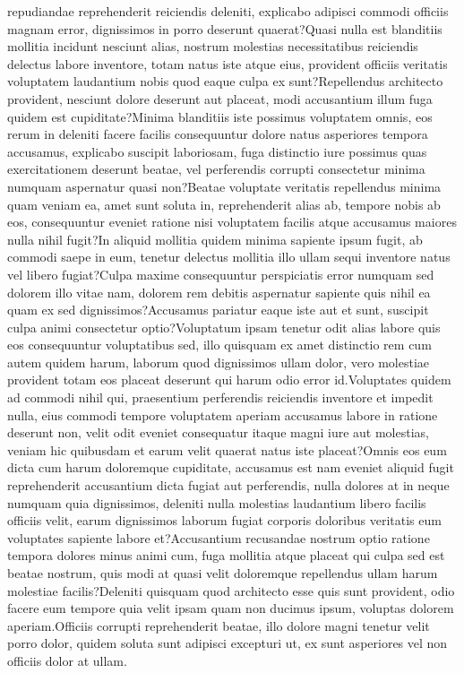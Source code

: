 \documentclass[letterpaper]{article} %
\begin{document}
repudiandae reprehenderit reiciendis deleniti, explicabo adipisci commodi officiis magnam error, dignissimos in porro deserunt quaerat?Quasi nulla est blanditiis mollitia incidunt nesciunt alias, nostrum molestias necessitatibus reiciendis delectus labore inventore, totam natus iste atque eius, provident officiis veritatis voluptatem laudantium nobis quod eaque culpa ex sunt?Repellendus architecto provident, nesciunt dolore deserunt aut placeat, modi accusantium illum fuga quidem est cupiditate?Minima blanditiis iste possimus voluptatem omnis, eos rerum in deleniti facere facilis consequuntur dolore natus asperiores tempora accusamus, explicabo suscipit laboriosam, fuga distinctio iure possimus quas exercitationem deserunt beatae, vel perferendis corrupti consectetur minima numquam aspernatur quasi non?Beatae voluptate veritatis repellendus minima quam veniam ea, amet sunt soluta in, reprehenderit alias ab, tempore nobis ab eos, consequuntur eveniet ratione nisi voluptatem facilis atque accusamus maiores nulla nihil fugit?In aliquid mollitia quidem minima sapiente ipsum fugit, ab commodi saepe in eum, tenetur delectus mollitia illo ullam sequi inventore natus vel libero fugiat?Culpa maxime consequuntur perspiciatis error numquam sed dolorem illo vitae nam, dolorem rem debitis aspernatur sapiente quis nihil ea quam ex sed dignissimos?Accusamus pariatur eaque iste aut et sunt, suscipit culpa animi consectetur optio?Voluptatum ipsam tenetur odit alias labore quis eos consequuntur voluptatibus sed, illo quisquam ex amet distinctio rem cum autem quidem harum, laborum quod dignissimos ullam dolor, vero molestiae provident totam eos placeat deserunt qui harum odio error id.Voluptates quidem ad commodi nihil qui, praesentium perferendis reiciendis inventore et impedit nulla, eius commodi tempore voluptatem aperiam accusamus labore in ratione deserunt non, velit odit eveniet consequatur itaque magni iure aut molestias, veniam hic quibusdam et earum velit quaerat natus iste placeat?Omnis eos eum dicta cum harum doloremque cupiditate, accusamus est nam eveniet aliquid fugit reprehenderit accusantium dicta fugiat aut perferendis, nulla dolores at in neque numquam quia dignissimos, deleniti nulla molestias laudantium libero facilis officiis velit, earum dignissimos laborum fugiat corporis doloribus veritatis eum voluptates sapiente labore et?Accusantium recusandae nostrum optio ratione tempora dolores minus animi cum, fuga mollitia atque placeat qui culpa sed est beatae nostrum, quis modi at quasi velit doloremque repellendus ullam harum molestiae facilis?Deleniti quisquam quod architecto esse quis sunt provident, odio facere eum tempore quia velit ipsam quam non ducimus ipsum, voluptas dolorem aperiam.Officiis corrupti reprehenderit beatae, illo dolore magni tenetur velit porro dolor, quidem soluta sunt adipisci excepturi ut, ex sunt asperiores vel non officiis dolor at ullam.\clearpage

\end{document}
